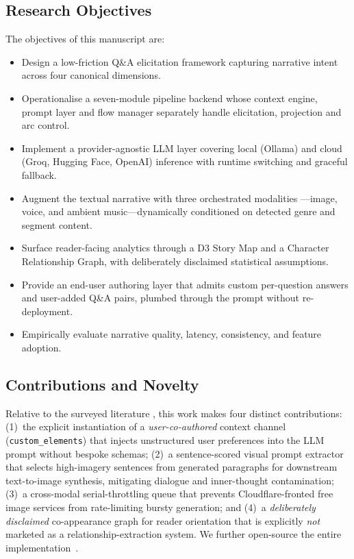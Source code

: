 \documentclass[conference,10pt,a4paper]{IEEEtran}
\begin{document}
\subsection{Research Objectives}
The objectives of this manuscript are:
\begin{itemize}
\item Design a low-friction Q\&A elicitation framework capturing
narrative intent across four canonical dimensions.
\item Operationalise a seven-module pipeline backend whose context
engine, prompt layer and flow manager separately handle elicitation,
projection and arc control.
\item Implement a provider-agnostic LLM layer covering local (Ollama)
and cloud (Groq, Hugging Face, OpenAI) inference with runtime
switching and graceful fallback.
\item Augment the textual narrative with three orchestrated modalities
---image, voice, and ambient music---dynamically conditioned on
detected genre and segment content.
\item Surface reader-facing analytics through a D3 Story Map and a
Character Relationship Graph, with deliberately disclaimed statistical
assumptions.
\item Provide an end-user authoring layer that admits custom
per-question answers and user-added Q\&A pairs, plumbed through the
prompt without re-deployment.
\item Empirically evaluate narrative quality, latency, consistency,
and feature adoption.
\end{itemize}

\subsection{Contributions and Novelty}
Relative to the surveyed literature
\cite{perezperez2001mexica,radford2019gpt2,brown2020gpt3,walton2019aidungeon,mirowski2023dramatron,chung2022talebrush,wei2022cot,liu2023endusers,yuan2022wordcraft,podell2024sdxl,bfl2024flux,w3c2024webspeech,casanova2024xtts,naveed2024llmsurvey,zhao2023llmsurvey,jia2024multimodalstory,wang2025narrativesurvey,liu2025coimagining},
this work makes four distinct contributions: (1)~the explicit
instantiation of a \emph{user-co-authored} context channel
(\texttt{custom\_elements}) that injects unstructured user preferences
into the LLM prompt without bespoke schemas; (2)~a sentence-scored
visual prompt extractor that selects high-imagery sentences from
generated paragraphs for downstream text-to-image synthesis,
mitigating dialogue and inner-thought contamination; (3)~a cross-modal
serial-throttling queue that prevents Cloudflare-fronted free image
services from rate-limiting bursty generation; and (4)~a
\emph{deliberately disclaimed} co-appearance graph for reader
orientation that is explicitly \emph{not} marketed as a
relationship-extraction system. We further open-source the entire
implementation~\cite{jha2026repo}.
\end{document}
